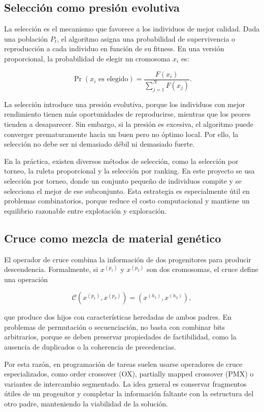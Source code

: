 \documentclass[11pt,a4paper]{article}
\begin{document}
\subsection{Selección como presión evolutiva}

La selección es el mecanismo que favorece a los individuos de mejor calidad. Dada una población $P_t$, el algoritmo asigna una probabilidad de supervivencia o reproducción a cada individuo en función de su fitness. En una versión proporcional, la probabilidad de elegir un cromosoma $x_i$ es:

$$
\Pr(x_i \text{ es elegido}) = \frac{F(x_i)}{\sum_{j=1}^{N} F(x_j)}.
$$

La selección introduce una presión evolutiva, porque los individuos con mejor rendimiento tienen más oportunidades de reproducirse, mientras que los peores tienden a desaparecer. Sin embargo, si la presión es excesiva, el algoritmo puede converger prematuramente hacia un buen pero no óptimo local. Por ello, la selección no debe ser ni demasiado débil ni demasiado fuerte.

En la práctica, existen diversos métodos de selección, como la selección por torneo, la ruleta proporcional y la selección por ranking. En este proyecto se usa selección por torneo, donde un conjunto pequeño de individuos compite y se selecciona el mejor de ese subconjunto. Esta estrategia es especialmente útil en problemas combinatorios, porque reduce el costo computacional y mantiene un equilibrio razonable entre explotación y exploración.

\subsection{Cruce como mezcla de material genético}

El operador de cruce combina la información de dos progenitores para producir descendencia. Formalmente, si $x^{(p_1)}$ y $x^{(p_2)}$ son dos cromosomas, el cruce define una operación

$$
\mathcal{C}(x^{(p_1)}, x^{(p_2)}) = (x^{(h_1)}, x^{(h_2)}),
$$

que produce dos hijos con características heredadas de ambos padres. En problemas de permutación o secuenciación, no basta con combinar bits arbitrarios, porque se deben preservar propiedades de factibilidad, como la ausencia de duplicados o la coherencia de precedencias.

Por esta razón, en programación de tareas suelen usarse operadores de cruce especializados, como order crossover (OX), partially mapped crossover (PMX) o variantes de intercambio segmentado. La idea general es conservar fragmentos útiles de un progenitor y completar la información faltante con la estructura del otro padre, manteniendo la viabilidad de la solución.
\end{document}
